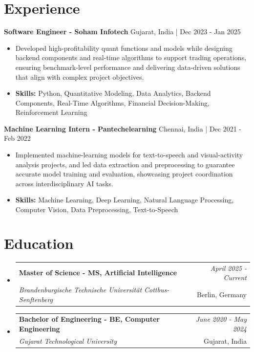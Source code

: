 \documentclass[a4paper,11pt]{article}
\makeatletter
\newcommand{\resumeSubheading}[4]{
\vspace{0.5mm}\item
    \begin{tabular*}{\linewidth}[t]{l@{\extracolsep{\fill}}r}
        \textbf{#1} & \textit{\footnotesize{#4}} \\
        \textit{\footnotesize{#3}} &  \footnotesize{#2}\\
    \end{tabular*}
    \vspace{-2.4mm}
}
\makeatother
\begin{document}
\section{\textbf{Experience}}


\vspace{1mm}
  \textbf{Software Engineer - Soham Infotech} \hfill Gujarat, India | Dec 2023 - Jan 2025
\vspace{-1.5mm} %
\begin{itemize}
  \item Developed high-profitability quant functions and models while designing backend components and real-time algorithms to support trading operations, ensuring benchmark-level performance and delivering data-driven solutions that align with complex project objectives.

\vspace{-2mm}
  \item \textbf{Skills:} Python, Quantitative Modeling, Data Analytics, Backend Components, Real-Time Algorithms, Financial Decision-Making, Reinforcement Learning
\end{itemize}

\vspace{1mm}
  \textbf{Machine Learning Intern - Pantechelearning} \hfill Chennai, India | Dec 2021 - Feb 2022
\vspace{-1.5mm} %
\begin{itemize}
  \item Implemented machine-learning models for text-to-speech and visual-activity analysis projects, and led data extraction and preprocessing to guarantee accurate model training and evaluation, showcasing project coordination across interdisciplinary AI tasks.
\vspace{-2mm}
  \item \textbf{Skills:} Machine Learning, Deep Learning, Natural Language Processing, Computer Vision, Data Preprocessing, Text-to-Speech
\end{itemize}\section{\textbf{Education}}
\vspace{-0.4mm}

\begin{itemize}[leftmargin=0.15in, label={}]
\resumeSubheading
{Master of Science - MS, Artificial Intelligence }{Berlin, Germany}
{Brandenburgische Technische Universität Cottbus-Senftenberg  }{April 2025 - Current}

\vspace{1.0mm} %
\resumeSubheading
{Bachelor of Engineering - BE, Computer Engineering  }{Gujarat, India}
{Gujarat Technological University }{June 2020 - May 2024}

\end{itemize}
\end{document}
